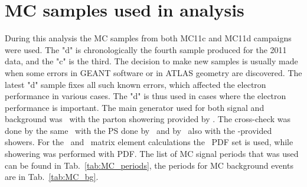 \begin{figure}
\end{figure}

\section{MC samples used in analysis}
\label{sec:MC_periods}

During this analysis the MC samples from both MC11c and MC11d campaigns were used. The "d" is chronologically the fourth sample produced for the 2011 data, and the "c" is the third. The decision to make new samples is usually made when some errors in GEANT software or in ATLAS geometry are discovered. The latest "d" sample fixes all such known errors, which affected the electron performance in various cases. The "d" is thus used in cases where the electron performance is important. The main generator used for both signal and background was \Powheg\ with the parton showering provided by \Pythia. The cross-check was done by the same \Powheg\ with the PS done by \Herwig\, and by \Mcatnlo\ also with the \Herwig-provided showers. For the
\Mcatnlo\ and \Powheg\ matrix element calculations the \pdfCteq\ PDF set is used, while showering was performed with \pdfCteql PDF. The list of MC signal periods that was used can be found in Tab.~\ref{tab:MC_periods}, the periods for MC background events are in Tab.~\ref{tab:MC_bg}.

